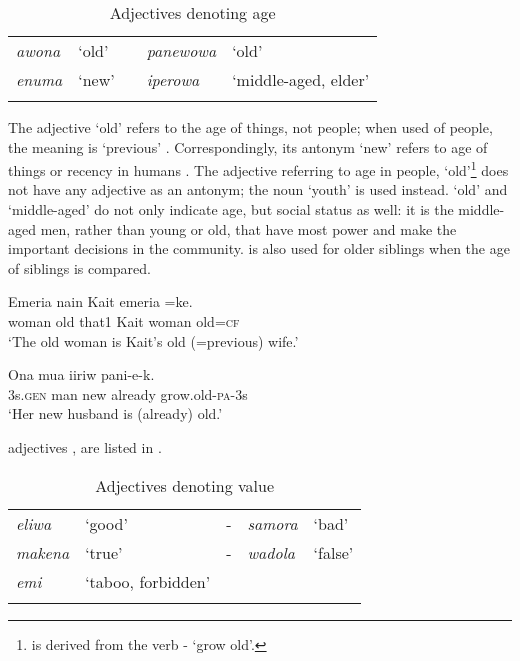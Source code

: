 \begin{table}
\caption{Adjectives denoting age}
\label{tab:3:age}

\begin{tabular}{>{\itshape}llc>{\itshape}ll}
\mytoprule
awona &`old' && panewowa &`old'\\
enuma &`new' && iperowa &`middle-aged, elder'\\ 
\mybottomrule
\end{tabular}
\end{table}

The adjective  `old' refers to the age of things, not people; when used of people, the meaning is `previous' . Correspondingly, its antonym  `new' refers to age of things or recency in humans . The adjective referring to age in people,  `old'\footnote{ is derived from the verb - `grow old'.} does not have any adjective as an antonym; the noun  `youth' is used instead.  `old' and  `middle-aged' do not only indicate age, but social status as well: it is the middle-aged men, rather than young or old, that have most power and make the important decisions in the community.  is also used for older siblings when the age of siblings is compared.

\ea%
\label{ex:3:x74}
\gll Emeria  nain Kait emeria =ke. \\
woman old that1 Kait woman old=\textsc{cf}\\
\glt`The old woman is Kait's old (=previous) wife.'
\z

\ea%
\label{ex:3:x75}
\gll Ona mua  iiriw pani-e-k. \\
3s.\textsc{gen} man new already grow.old-\textsc{pa}-3s\\
\glt`Her new husband is (already) old.'
\z

 adjectives ,  are listed in . 

\begin{table}
\caption{Adjectives denoting value}
\label{tab:3:valueadj}

\begin{tabular}{>{\itshape}llc>{\itshape}ll}
\mytoprule
eliwa &`good' &- &samora &`bad'\\
makena &`true' &- &wadola &`false'\\
emi &`taboo, forbidden'\\
\mybottomrule
\end{tabular}
\end{table}

